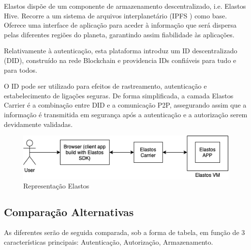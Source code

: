 Elastos dispõe de um componente de armazenamento descentralizado, i.e. Elastos Hive. Recorre a um sistema de arquivos interplanetário (IPFS \label{sym:IPFS}) \cite{ipfs} como base. Oferece uma interface de aplicação para aceder à informação que será dispersa pelas diferentes regiões do planeta, garantindo assim fiabilidade às aplicações.\cite{elastos_white_paper}

Relativamente à autenticação, esta plataforma introduz um ID descentralizado (DID), construído na rede Blockchain e providencia IDs confiáveis para tudo e para todos. 

O ID pode ser utilizado para efeitos de rastreamento, autenticação e estabelecimento de ligações seguras. De forma simplificada, a camada Elastos Carrier é a combinação entre DID e a comunicação P2P, assegurando assim que a informação é transmitida em segurança após a autenticação e a autorização serem devidamente validadas.\cite{elastos_white_paper}

\begin{figure}[h]
    \begin{center}
    \includegraphics[width=1\textwidth]{figures/estado_arte-Elastos.png}
    \caption{Representação Elastos}
    \end{center}
\end{figure}

\subsection{Comparação Alternativas}

As diferentes serão de seguida comparada, sob a forma de tabela, em função de 3 características principais: Autenticação, Autorização, Armazenamento.




